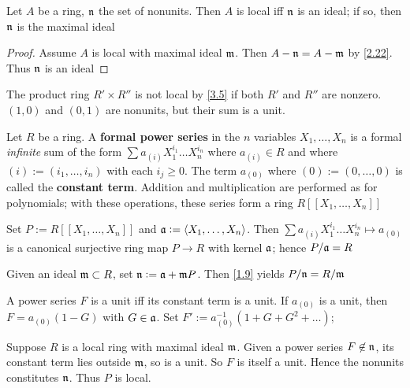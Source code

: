 \documentclass[11pt]{article}
\begin{document}
\begin{lemma}
\label{3.5}
Let \(A\) be a ring, \(\fn\) the set of nonunits. Then \(A\) is local iff
\(\fn\) is an ideal; if so, then \(\fn\) is the maximal ideal
\end{lemma}

\begin{proof}
Assume \(A\) is local with maximal ideal \(\fm\). Then \(A-\fn=A-\fm\) by
\ref{2.22}. Thus \(\fn\) is an ideal
\end{proof}

\begin{examplle}[]
The product ring \(R'\times R''\) is not local by \ref{3.5} if both \(R'\) and
\(R''\) are nonzero. \((1,0)\) and \((0,1)\) are nonunits, but their sum is a unit.
\end{examplle}

\begin{examplle}[]
Let \(R\) be a ring. A \textbf{formal power series} in the \(n\) variables
\(X_1,\dots,X_n\) is a formal \emph{infinite} sum of the form \(\sum
  a_{(i)}X_1^{i_1}\dots X_n^{i_n}\) where \(a_{(i)}\in R\) and where
\((i):=(i_1,\dots,i_n)\) with each \(i_j\ge0\). The term \(a_{(0)}\) where
\((0):=(0,\dots,0)\) is called the \textbf{constant term}. Addition and multiplication
are performed as for polynomials; with these operations, these series form a
ring \(R[[X_1,\dots,X_n]]\)

Set \(P:=R[[X_1,\dots,X_n]]\) and \(\fa:=\la X_1,\dots,X_n\ra\). Then \(\sum
  a_{(i)}X_1^{i_1}\dots X_n^{i_n}\mapsto a_{(0)}\) is a canonical surjective
ring map \(P\to R\) with kernel \(\fa\); hence \(P/\fa=R\)

Given an ideal \(\fm\subset R\), set \(\fn:=\fa+\fm P\). Then \ref{1.9} yields
\(P/\fn=R/\fm\)

A power series \(F\) is a unit iff its constant term is a unit. If \(a_{(0)}\)
is a unit, then \(F=a_{(0)}(1-G)\) with \(G\in\fa\). Set
\(F':=a_{(0)}^{-1}(1+G+G^2+\dots)\);

Suppose \(R\) is a local ring with maximal ideal \(\fm\). Given a power series
\(F\not\in\fn\), its constant term lies outside \(\fm\), so is a unit. So
\(F\) is itself a unit. Hence the nonunits constitutes \(\fn\). Thus \(P\) is
local.
\end{examplle}
\end{document}
